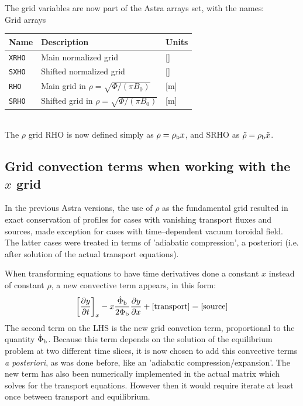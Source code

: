 The grid variables are now part of the Astra arrays set, with the names:
\\
Grid arrays\\[2ex]
\begin{tabular}{|l|l|l|}					\hline
\bf Name	& Description & Units\\ \hline
\tt XRHO 	& Main normalized grid & []\\
\tt SXHO 	& Shifted normalized grid & []\\
\tt RHO 	& Main grid in $\rho=\sqrt{\Phi/(\pi B_0)}$ & [m]\\
\tt SRHO 	& Shifted grid in $\rho=\sqrt{\Phi/(\pi B_0)}$ & [m]\\
\hline
\end{tabular}
\bigskip\\
The $\rho$ grid RHO is now defined simply as $\rho = \rho_{\rm b} x$, and SRHO as
$\tilde{\rho} = \rho_{\rm b} \tilde{x}$.
%
\subsection{Grid convection terms when working with the $x$ grid}
In the previous Astra versions, the use of $\rho$ as the fundamental grid
resulted in exact conservation of profiles for cases with vanishing transport
fluxes and sources, made exception for cases with time--dependent vacuum 
toroidal field. The latter cases were treated in terms of 'adiabatic 
compression', a posteriori (i.e. after solution of the actual transport 
equations).

When transforming equations to have time derivatives done a constant $x$ instead
of constant $\rho$, a new convective term appears, in this form:
\begin{eqnarray}
\left[\frac{\partial y}{\partial t}\right]_x - x\frac{\dot{\Phi}_{\rm b}}{2\Phi_{\rm b}} \frac{\partial y}{\partial x} + \left[{\rm transport} \right]= \left[{\rm source}\right]
\label{gridconvtermseq}
\end{eqnarray}
The second term on the LHS is the new grid convetion term, proportional to 
the quantity $\dot{\Phi}_{\rm b}$.
Because this term depends on the solution of the equilibrium problem at two 
different time slices, it is now chosen to add this convective terms {\it a 
posteriori}, as was done before, like an 'adiabatic compression/expansion'. 
The new term has also been numerically implemented in the actual matrix which 
solves for the transport equations. However then it would require iterate at 
least once between transport and equilibrium.

